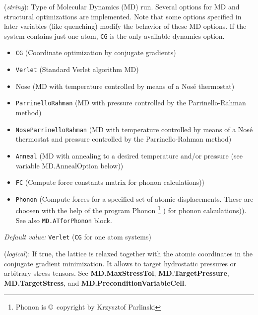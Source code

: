\documentclass[11pt]{article}
\begin{document}
\begin{description}
\itemsep 10pt
\parsep 0pt

\item[{\bf MD.TypeOfRun}] ({\it string}): 
Type of Molecular Dynamics (MD)  run. 
Several options for MD and structural optimizations are 
implemented. Note that some options specified in later variables
(like quenching) modify the behavior of these MD options.
If the system contains just one atom, {\tt CG} is the only 
available dynamics option.
\begin{itemize}
\item {\tt CG} (Coordinate optimization by conjugate gradients)
\item {\tt Verlet} (Standard Verlet algorithm MD)
\item Nose  (MD with temperature controlled  by means of a Nos\'e 
thermostat)
\item {\tt ParrinelloRahman}  (MD with pressure controlled by 
the Parrinello-Rahman method)
\item {\tt NoseParrinelloRahman}  (MD with temperature controlled
by means of a Nos\'e thermostat and pressure controlled by 
the Parrinello-Rahman method)
\item {\tt Anneal}  (MD with annealing to a desired
temperature and/or pressure (see variable MD.AnnealOption below))
\item {\tt FC}  (Compute force constants matrix for phonon
calculations))

\item {\tt Phonon} (Compute forces for a specified set of atomic
displacements. These are choosen with the help of the program {\sc
Phonon} \footnote{{\sc Phonon} is \copyright\ copyright by Krzysztof
Parlinski} )   for phonon calculations)). See
also {\tt MD.ATforPhonon} block.
\end{itemize}
    
{\it Default value:} {\tt Verlet} ({\tt CG} for one atom systems)


\item[{\bf MD.VariableCell}] ({\it logical}):
 
If true, the lattice is relaxed together with the atomic coordinates
in the conjugate gradient minimization. It allows to target
hydrostatic pressures or arbitrary stress tensors.  See {\bf
MD.MaxStressTol}, {\bf MD.TargetPressure}, {\bf MD.TargetStress}, and
{\bf MD.PreconditionVariableCell}.


\end{description}
\end{document}
